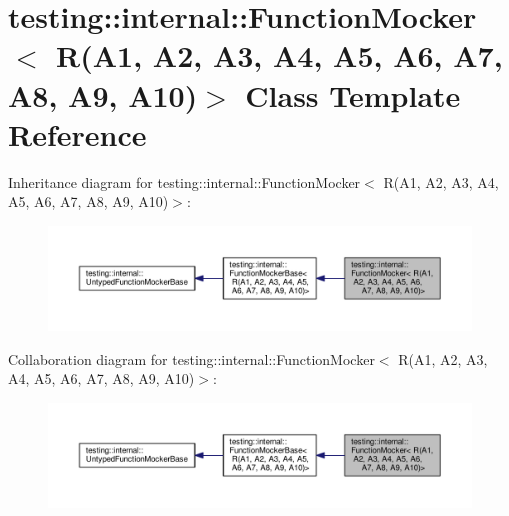 \hypertarget{classtesting_1_1internal_1_1_function_mocker_3_01_r_07_a1_00_01_a2_00_01_a3_00_01_a4_00_01_a5_0038b5baf41d3183579372e0e15a9db969}{}\section{testing\+:\+:internal\+:\+:Function\+Mocker$<$ R(A1, A2, A3, A4, A5, A6, A7, A8, A9, A10)$>$ Class Template Reference}
\label{classtesting_1_1internal_1_1_function_mocker_3_01_r_07_a1_00_01_a2_00_01_a3_00_01_a4_00_01_a5_0038b5baf41d3183579372e0e15a9db969}


Inheritance diagram for testing\+:\+:internal\+:\+:Function\+Mocker$<$ R(A1, A2, A3, A4, A5, A6, A7, A8, A9, A10)$>$\+:
\nopagebreak
\begin{figure}[H]
\begin{center}
\leavevmode
\includegraphics[width=350pt]{classtesting_1_1internal_1_1_function_mocker_3_01_r_07_a1_00_01_a2_00_01_a3_00_01_a4_00_01_a5_0032b6254217e4edd37bb70083da847c93}
\end{center}
\end{figure}


Collaboration diagram for testing\+:\+:internal\+:\+:Function\+Mocker$<$ R(A1, A2, A3, A4, A5, A6, A7, A8, A9, A10)$>$\+:
\nopagebreak
\begin{figure}[H]
\begin{center}
\leavevmode
\includegraphics[width=350pt]{classtesting_1_1internal_1_1_function_mocker_3_01_r_07_a1_00_01_a2_00_01_a3_00_01_a4_00_01_a5_0067619023e5faa879d3453d1bd5bba987}
\end{center}
\end{figure}
